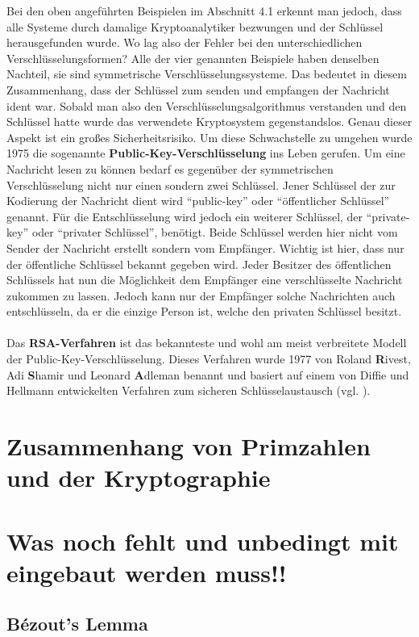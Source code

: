 \documentclass[german,12pt,a4paper]{article}
\begin{document}
Bei den oben angeführten Beispielen im Abschnitt 4.1 erkennt man jedoch, dass alle Systeme durch damalige Kryptoanalytiker bezwungen und der Schlüssel herausgefunden wurde. Wo lag also der Fehler bei den unterschiedlichen Verschlüsselungsformen? Alle der vier genannten Beispiele haben denselben Nachteil, sie sind symmetrische Verschlüsselungssysteme. Das bedeutet in diesem Zusammenhang, dass der Schlüssel zum senden und empfangen der Nachricht ident war. Sobald man also den Verschlüsselungsalgorithmus verstanden und den Schlüssel hatte wurde das verwendete Kryptosystem gegenstandslos. Genau dieser Aspekt ist ein großes Sicherheitsrisiko. Um diese Schwachstelle zu umgehen wurde 1975 die sogenannte \textbf{Public-Key-Verschlüsselung} ins Leben gerufen. Um eine Nachricht lesen zu können bedarf es gegenüber der symmetrischen Verschlüsselung nicht nur einen sondern zwei Schlüssel. Jener Schlüssel der zur Kodierung der Nachricht dient wird “public-key” oder “öffentlicher Schlüssel” genannt. Für die Entschlüsselung wird jedoch ein weiterer Schlüssel, der “private-key” oder “privater Schlüssel”, benötigt. Beide Schlüssel werden hier nicht vom Sender der Nachricht erstellt sondern vom Empfänger. Wichtig ist hier, dass nur der öffentliche Schlüssel bekannt gegeben wird. Jeder Besitzer des öffentlichen Schlüssels hat nun die Möglichkeit dem Empfänger eine verschlüsselte Nachricht zukommen zu lassen. Jedoch kann nur der Empfänger solche Nachrichten auch entschlüsseln, da er die einzige Person ist, welche den privaten Schlüssel besitzt.\\\\
Das \textbf{RSA-Verfahren} ist das bekannteste und wohl am meist verbreitete Modell der Public-Key-Verschlüsselung. Dieses Verfahren wurde 1977 von Roland \textbf{R}ivest, Adi \textbf{S}hamir und Leonard \textbf{A}dleman benannt und basiert auf einem von Diffie und Hellmann entwickelten Verfahren zum sicheren Schlüsselaustausch (vgl. \cite[105]{RempeGillen2009}).

\section{Zusammenhang von Primzahlen und der Kryptographie}

\newpage

\section{Was noch fehlt und unbedingt mit eingebaut werden muss!!}
\subsection{Bézout's Lemma}
\end{document}
